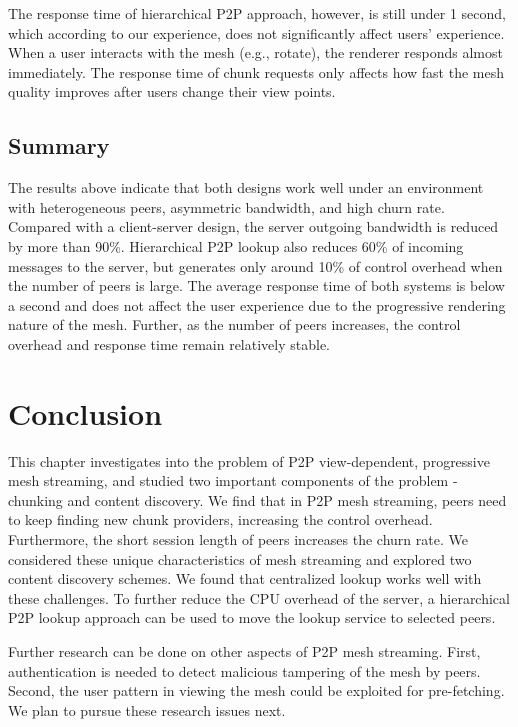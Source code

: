     The response time of hierarchical P2P approach, however, is still
    under 1 second, which according to our experience, does not
    significantly affect users' experience.  When a user interacts with
    the mesh (e.g., rotate), the renderer responds almost immediately. 
    The response time of chunk requests only affects how fast the 
    mesh quality improves after users change their view points.
    
    
    

    \subsection{Summary}
    The results above indicate that
    both designs work well under an environment with heterogeneous peers, 
    asymmetric bandwidth, and high churn rate. Compared with a
    client-server design, the server outgoing bandwidth 
    is reduced by more than 90\%.  Hierarchical P2P
    lookup also reduces 60\% of incoming messages to the server,
    but generates  
    only around 10\% of control overhead when the number of peers is large. 
    The average response time of both systems is below 
    a second and does not affect the user experience due to the
    progressive rendering nature of the mesh.   
    Further, as the number of peers
    increases, the control overhead and response time remain
    relatively stable.

\section{Conclusion}
\label{s:conclude}
This chapter investigates into the problem of P2P view-dependent,
progressive mesh streaming, and studied two important components of
the problem - chunking and content discovery. We find that in P2P mesh
streaming, peers need to keep finding new chunk providers, increasing
the control overhead. Furthermore, the short session length of peers
increases the churn rate. We considered these unique characteristics
of mesh streaming and explored two content discovery schemes. We found
that centralized lookup works well with these challenges. To further
reduce the CPU overhead of the server, a hierarchical P2P lookup
approach can be used to move the lookup service to selected peers.

Further research can be done on other aspects of P2P mesh streaming. 
First, authentication is needed to detect malicious tampering of the
mesh by peers. Second, the user pattern in viewing the mesh could be
exploited for pre-fetching. We plan to pursue these research issues
next.



